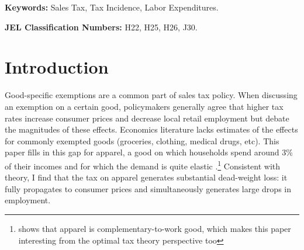 \documentclass[12pt]{article}
\begin{document}
	\strut

	\textbf{Keywords:} Sales Tax, Tax Incidence, Labor Expenditures.


	\textbf{JEL Classification Numbers:} H22, H25, H26, J30.
		
		\newpage
		\section{Introduction}
		
		
		Good-specific exemptions are a common part of sales tax policy. 
		When discussing an exemption on a certain good, policymakers generally agree that higher tax rates increase consumer prices and decrease local retail employment but debate the magnitudes of these effects. Economics literature lacks estimates of the effects for commonly exempted goods (groceries, clothing, medical drugs, etc). This paper fills in this gap for apparel, a good on which households spend around 3\% of their incomes and for which the demand is quite elastic \citet{hu, agarwals,einav}.\footnote{\citep{aguiar} shows that apparel is complementary-to-work good, which makes this paper interesting from the optimal tax theory perspective too} Consistent with theory, I find that the tax on apparel generates substantial dead-weight loss: it fully propagates to consumer prices and simultaneously generates large drops in employment. 
		
		 
		
\end{document}

